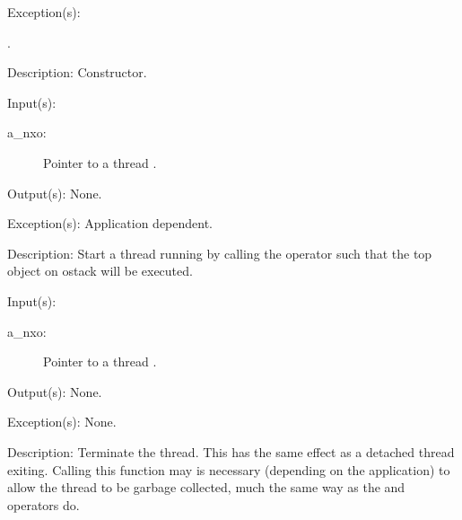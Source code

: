 \begin{capi}
\begin{capilist}
	\item[Exception(s): ]
		\begin{description}\item[]
		\item[.]
		\end{description}
	\item[Description: ]
		Constructor.
	\end{capilist}
\label{nxo_thread_start}
	\begin{capilist}
	\item[Input(s): ]
		\begin{description}\item[]
		\item[a\_nxo: ]
			Pointer to a thread .
		\end{description}
	\item[Output(s): ] None.
	\item[Exception(s): ] Application dependent.
	\item[Description: ]
		Start a thread running by calling the 
		operator such that the top object on ostack will be executed.
	\end{capilist}
\label{nxo_thread_exit}
	\begin{capilist}
	\item[Input(s): ]
		\begin{description}\item[]
		\item[a\_nxo: ]
			Pointer to a thread \classname{nxo}.
		\end{description}
	\item[Output(s): ] None.
	\item[Exception(s): ] None.
	\item[Description: ]
		Terminate the thread.  This has the same effect as a detached
		thread exiting.  Calling this function may is necessary
		(depending on the application) to allow the thread to be garbage
		collected, much the same way as the \onyxop{}{detach}{} and
		 operators do.
	\end{capilist}
\label{nxo_thread_thread}
	\begin{capilist}

\end{capilist}
\end{capi}
